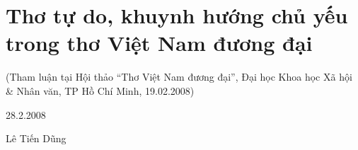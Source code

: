 \documentclass[../main.tex]{subfiles}
\begin{document}
\chapter{Thơ tự do, khuynh hướng chủ yếu trong thơ Việt Nam đương đại}

\begin{subtitle}

(Tham luận tại Hội thảo “Thơ Việt Nam đương đại”, Đại học Khoa học Xã hội & Nhân văn, TP Hồ Chí Minh, 19.02.2008)

\end{subtitle}

\begin{metadata}

\begin{flushright}28.2.2008\end{flushright}

Lê Tiến Dũng



\end{metadata}
\end{document}
